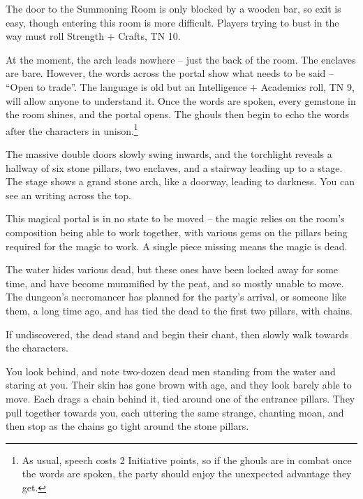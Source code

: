 \begin{multicols}{2}
The door to the Summoning Room is only blocked by a wooden bar, so exit is easy, though entering this room is more difficult.
Players trying to bust in the way must roll Strength + Crafts, TN 10.


At the moment, the arch leads nowhere  -- just the back of the room.  The enclaves are bare.
However, the words across the portal show what needs to be said -- ``Open to trade''.
The language is old but an Intelligence + Academics roll, TN 9, will allow anyone to understand it.
Once the words are spoken, every gemstone in the room shines, and the portal opens.
The ghouls then begin to echo the words after the characters in unison.\footnote{As usual, speech costs 2 Initiative points, so if the ghouls are in combat once the words are spoken, the party should enjoy the unexpected advantage they get.}

\begin{boxtext}

	The massive double doors slowly swing inwards, and the torchlight reveals a hallway of six stone pillars, two enclaves, and a stairway leading up to a stage.  The stage shows a grand stone arch, like a doorway, leading to darkness.
	You can see an writing across the top.

\end{boxtext}

This magical portal is in no state to be moved -- the magic relies on the room's composition being able to work together, with various gems on the pillars being required for the magic to work.
A single piece missing means the magic is dead.

The water hides various dead, but these ones have been locked away for some time, and have become mummified by the peat, and so mostly unable to move.  The dungeon's necromancer has planned for the party's arrival, or someone like them, a long time ago, and has tied the dead to the first two pillars, with chains.

If undiscovered, the dead stand and begin their chant, then slowly walk towards the characters.

\begin{boxtext}
	You look behind, and note two-dozen dead men standing from the water and staring at you.
	Their skin has gone brown with age, and they look barely able to move.
	Each drags a chain behind it, tied around one of the entrance pillars.
	They pull together towards you, each uttering the same strange, chanting moan, and then stop as the chains go tight around the stone pillars.
\end{boxtext}


\end{multicols}
